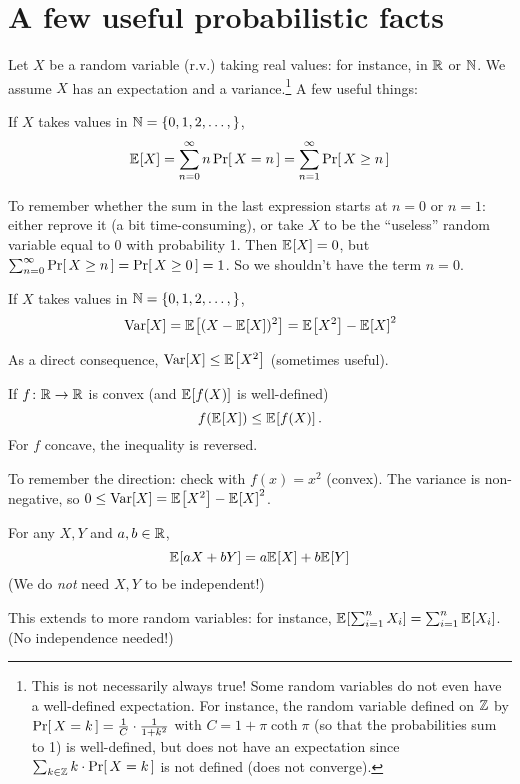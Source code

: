 \documentclass[10pt]{article}
\begin{document}
\section{A few useful probabilistic facts}
Let $X$ be a random variable (r.v.) taking real values: for instance, in $\mathbb{R}$ or $\mathbb{N}$. We assume $X$ has an expectation and a variance.\footnote{This is not necessarily always true! Some random variables do not even have a well-defined expectation. For instance, the random variable defined on $\mathbb{Z}$ by $\probaOf{X=k} = \frac{1}{C}\cdot \frac{1}{1+k^2}$ with $C = 1+\pi\coth \pi$ (so that the probabilities sum to 1) is well-defined, but does not have an expectation since $\sum_{k\in\Z}k\cdot \probaOf{X=k}$ is not defined (does not converge).} A few useful things:
\begin{fact}
If $X$ takes values in $\mathbb{N} = \{0,1,2,\dots,\}$,
\[
\bEE{X} = \sum_{n=0}^\infty n\probaOf{X=n} = \sum_{n=1}^\infty\probaOf{X \geq n}
\]
\end{fact}
To remember whether the sum in the last expression starts at $n=0$ or $n=1$: either reprove it (a bit time-consuming), or take $X$ to be the ``useless'' random variable equal to 0 with probability 1. Then $\bEE{X}=0$, but $\sum_{n=0}^\infty\probaOf{X \geq n} = \probaOf{X \geq 0} = 1$. So we shouldn't have the term $n=0$.

\begin{fact}
If $X$ takes values in $\mathbb{N} = \{0,1,2,\dots,\}$,
\[
\var[X] = \bEE{(X-\bEE{X})^2} = \bEE{X^2}-\bEE{X}^2
\]
\end{fact}
As a direct consequence, $\var[X]\leq \bEE{X^2}$ (sometimes useful).

\begin{lemma}
If $f\colon\mathbb{R}\to\mathbb{R}$ is convex (and $\bEE{f(X)}$ is well-defined)
\[
f(\bEE{X}) \leq \bEE{f(X)}\,.
\]
For $f$ concave, the inequality is reversed.
\end{lemma}
To remember the direction: check with $f(x)=x^2$ (convex). The variance is non-negative, so $0 \leq \var[X] = \bEE{X^2}-\bEE{X}^2$.

\begin{fact}
For any $X,Y$ and $a, b \in \mathbb{R}$,
\[
\bEE{aX+bY} = a\bEE{X}+b\bEE{Y}
\]
(We do \emph{not} need $X,Y$ to be independent!)
\end{fact}
\noindent This extends to more random variables: for instance, $\bEE{\sum_{i=1}^n X_i} = \sum_{i=1}^n \bEE{X_i}$. (No independence needed!)
\end{document}
